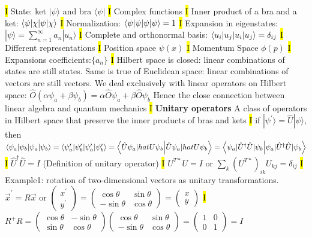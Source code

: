 \documentclass[fontsize=4pt]{scrartcl}
\begin{document}
\hl{I}
State: ket $|\psi \rangle$ and bra $\langle \psi |$
\hl{I}
Complex functions 
\hl{I}
Inner product of a bra and a ket: $\braket{\psi | \chi}$
\hl{I}
Normalization: $\braket{\psi | \psi} = 1$
\hl{I}
Expansion in eigenstates: $|\psi \rangle = \sum_{n=1}^{\infty} a_n | u_n \rangle$
\hl{I}
Complete and orthonormal basis: $\braket{u_i | u_j} = \delta_{ij}$
\hl{I}
Different representations
\hl{I}
Position space $\psi(x)$
\hl{I}
Momentum Space $\phi(p)$
\hl{I}
Expansions coefficients:$\{ a_n\}$
\hl{I}
Hilbert space is closed: linear combinations of states are still states. Same is true of Euclidean space: linear combinations of vectors are still vectors. We deal exclusively with linear operators on Hilbert space: $\hat{O} (\alpha \psi_a + \beta \psi_b) = \alpha \hat{O} \psi_a + \beta \hat{O} \psi_b$ Hence the close connection between linear algebra and quantum mechanics
\hl{I}
\textbf{Unitary operators} A class of operators in Hilbert space that preserve the inner products of bras and kets
\hl{I}
if $| \psi^{\prime} \rangle = \hat{U} | \psi \rangle$, then $\braket{\psi_a | \psi_b} = \braket{\psi_a^{\prime} | \psi_b^{\prime}} = \braket{\hat{U} \psi_a | hat{U} \psi_b } = \braket{\psi_a | \hat{U}^{\dag} \hat{U} | \psi_b } $
\hl{I}
$\hat{U}^{\dag} \hat{U} = I$ (Definition of unitary operator)
\hl{I}
$U^{T*}U  = I$ or $\sum_k (U^{T*})_{ik} U_{kj} = \delta_{ij}$
\hl{I}
Example1: rotation of two-dimensional vectors as unitary transformations.
$\vec{x}^{\prime} = R\vec{x}$ or $ \begin{pmatrix} x^{\prime}\\ y^{\prime} \end{pmatrix} = \begin{pmatrix} \cos \theta & \sin \theta \\ -\sin \theta & \cos \theta \end{pmatrix} = \begin{pmatrix} x \\ y \end{pmatrix} $
\hl{I}
$R^{+}R = \begin{pmatrix} \cos \theta & -\sin \theta \\ \sin \theta & \cos \theta \end{pmatrix} \begin{pmatrix} \cos \theta & \sin \theta \\ -\sin \theta & \cos \theta \end{pmatrix} = \begin{pmatrix} 1 & 0 \\ 0 & 1 \end{pmatrix} = I $
\end{document}
